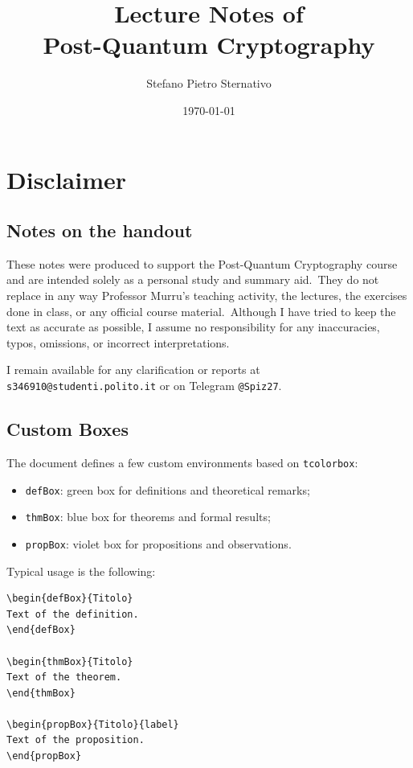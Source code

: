\documentclass[a4paper,12pt]{article} %
\title{Lecture Notes of \\Post-Quantum Cryptography}
\author{Stefano Pietro Sternativo}
\date{\today}
\begin{document}
\maketitlecustom %

\tableofcontents %
\newpage

\section*{Disclaimer}

\subsection*{Notes on the handout}
These notes were produced to support the Post-Quantum Cryptography course and are intended solely as a personal study and summary aid.\
They do not replace in any way Professor Murru's teaching activity, the lectures, the exercises done in class, or any official course material.\
Although I have tried to keep the text as accurate as possible, I assume no responsibility for any inaccuracies, typos, omissions, or incorrect interpretations.

\medskip
\noindent
I remain available for any clarification or reports at \texttt{s346910@studenti.polito.it} or on Telegram \texttt{@Spiz27}.

\subsection*{Custom Boxes}
The document defines a few custom environments based on \texttt{tcolorbox}:
\begin{itemize}
	\item \texttt{defBox}: green box for definitions and theoretical remarks;
	\item \texttt{thmBox}: blue box for theorems and formal results;
	\item \texttt{propBox}: violet box for propositions and observations.
\end{itemize}

\noindent
Typical usage is the following:
\begin{verbatim}
\begin{defBox}{Titolo}
Text of the definition.
\end{defBox}

\begin{thmBox}{Titolo}
Text of the theorem.
\end{thmBox}

\begin{propBox}{Titolo}{label}
Text of the proposition.
\end{propBox}
\end{verbatim}
\end{document}
